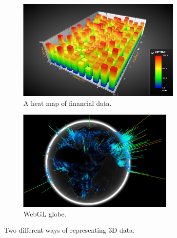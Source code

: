 
\begin{figure}[H]
    \newcommand{\figurewidth}{0.5\textwidth}
    \newcommand{\figureheight}{5cm}
	\begin{subfigure}[b]{\figurewidth}
        \centering
        \includegraphics[width=\textwidth,height=\figureheight]{images/introduction/financial}
        \caption{A heat map of financial data. \protect\footnotemark}
        \label{fig:heat_map_financial}
    \end{subfigure}
    \begin{subfigure}[b]{\figurewidth}
        \centering
        \includegraphics[width=\textwidth,height=\figureheight]{images/introduction/globe}
        \caption{WebGL globe. \protect\footnotemark}
        \label{fig:webgl_globe}
    \end{subfigure}
	\caption[3D representations]{Two different ways of representing 3D data.}
	\label{fig:3d_representations}
\end{figure}

\addtocounter{footnote}{-2}
